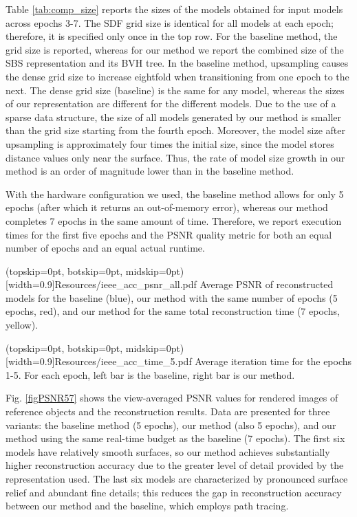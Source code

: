\documentclass{ieeeaccess}
\begin{document}
Table \ref{tab:comp_size} reports the sizes of the models obtained for input models across epochs 3-7. The SDF grid size is identical for all models at each epoch; therefore, it is specified only once in the top row. For the baseline method, the grid size is reported, whereas for our method we report the combined size of the SBS representation and its BVH tree. In the baseline method, upsampling causes the dense grid size to increase eightfold when transitioning from one epoch to the next. The dense grid size (baseline) is the same for any model, whereas the sizes of our representation are different for the different models. Due to the use of a sparse data structure, the size of all models generated by our method is smaller than the grid size starting from the fourth epoch. Moreover, the model size after upsampling is approximately four times the initial size, since the model stores distance values only near the surface. Thus, the rate of model size growth in our method is an order of magnitude lower than in the baseline method.

With the hardware configuration we used, the baseline method allows for only 5 epochs (after which it returns an out-of-memory error), whereas our method completes 7 epochs in the same amount of time. Therefore, we report execution times for the first five epochs and the PSNR quality metric for both an equal number of epochs and an equal actual runtime.

\Figure[t](topskip=0pt, botskip=0pt, midskip=0pt)[width=0.9\textwidth]{Resources/ieee_acc_psnr_all.pdf} {
    Average PSNR of reconstructed models for the baseline (blue), our method with the same number of epochs (5 epochs, red), and our method for the same total reconstruction time (7 epochs, yellow).\label{figPSNR57}
}

\Figure[h](topskip=0pt, botskip=0pt, midskip=0pt)[width=0.9\linewidth]{Resources/ieee_acc_time_5.pdf} {
    Average iteration time for the epochs 1-5. For each epoch, left bar is the baseline, right bar is our method.
    \label{figTime5}
}

Fig. \ref{figPSNR57} shows the view-averaged PSNR values for rendered images of reference objects and the reconstruction results. Data are presented for three variants: the baseline method (5 epochs), our method (also 5 epochs), and our method using the same real-time budget as the baseline (7 epochs). The first six models have relatively smooth surfaces, so our method achieves substantially higher reconstruction accuracy due to the greater level of detail provided by the representation used. The last six models are characterized by pronounced surface relief and abundant fine details; this reduces the gap in reconstruction accuracy between our method and the baseline, which employs path tracing.
\end{document}
